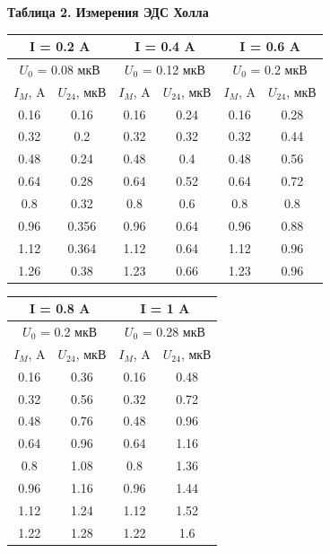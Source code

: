 \documentclass[15pt,a5paper,reqno]{article}
\begin{document}
    \noindent\hypertarget{table_2}{\textbf{Таблица 2. Измерения ЭДС Холла}}
    \begin{center}
        \begin{tabular}{|c|c|c|c|c|c|}
            \hline
            \multicolumn{2}{|c|}{I = 0.2 A} & \multicolumn{2}{|c|}{I = 0.4 A} & \multicolumn{2}{|c|}{I = 0.6 A} \\ \hline
            \multicolumn{2}{|c|}{$U_0$ = 0.08 мкВ} & \multicolumn{2}{|c|}{$U_0$ = 0.12 мкВ} & \multicolumn{2}{|c|}{$U_0$ = 0.2 мкВ} \\ \hline\hline 
            $I_M$, A & $U_{24}$, мкВ & $I_M$, A & $U_{24}$, мкВ & $I_M$, A & $U_{24}$, мкВ \\ \hline\hline
            0.16     & 0.16   & 0.16     & 0.24   & 0.16     & 0.28   \\ \hline
            0.32     & 0.2    & 0.32     & 0.32   & 0.32     & 0.44   \\ \hline
            0.48     & 0.24   & 0.48     & 0.4    & 0.48     & 0.56   \\ \hline
            0.64     & 0.28   & 0.64     & 0.52   & 0.64     & 0.72   \\ \hline
            0.8	     & 0.32   & 0.8      & 0.6    & 0.8      & 0.8    \\ \hline
            0.96     & 0.356  & 0.96     & 0.64   & 0.96     & 0.88   \\ \hline
            1.12     & 0.364  & 1.12     & 0.64   & 1.12     & 0.96   \\ \hline
            1.26     & 0.38   & 1.23     & 0.66   & 1.23     & 0.96   \\ \hline
        \end{tabular}
    \end{center}
    \begin{center}
        \begin{tabular}{|c|c|c|c|}
            \hline
            \multicolumn{2}{|c|}{I = 0.8 A} & \multicolumn{2}{|c|}{I = 1 A} \\ \hline
            \multicolumn{2}{|c|}{$U_0$ = 0.2 мкВ} & \multicolumn{2}{|c|}{$U_0$ = 0.28 мкВ} \\ \hline\hline
            $I_M$, A & $U_{24}$, мкВ & $I_M$, A & $U_{24}$, мкВ \\ \hline\hline
            0.16     & 0.36   & 0.16     & 0.48   \\ \hline
            0.32     & 0.56   & 0.32     & 0.72   \\ \hline
            0.48     & 0.76   & 0.48     & 0.96   \\ \hline
            0.64     & 0.96   & 0.64     & 1.16   \\ \hline
            0.8      & 1.08   & 0.8      & 1.36   \\ \hline
            0.96     & 1.16   & 0.96     & 1.44   \\ \hline
            1.12     & 1.24   & 1.12     & 1.52   \\ \hline
            1.22     & 1.28   & 1.22     & 1.6    \\ \hline
        \end{tabular}
    \end{center}
\end{document}
